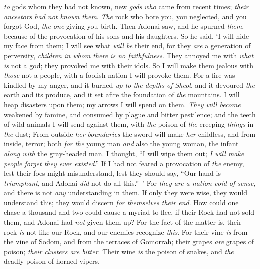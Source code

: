 \begin{biblechapter}
\textit{to} gods whom they had not known, 
new \textit{gods} \textit{who} came from recent times; 
\textit{their ancestors had not known them}.
\verse \textit{The} rock who bore you, you neglected, 
and you forgot God, \textit{the one} giving you birth.
\verse Then Adonai saw, and he spurned \textit{them}, 
because of the provocation of his sons and his daughters.
\verse So he said, ‘I will hide my face from them; 
I will see what \textit{will be} their end, 
for they \textit{are} a generation of perversity, 
\textit{children in whom there is no faithfulness}.
\verse They annoyed me with \textit{what is} not a god; 
they provoked me with their idols. 
So I will make them jealous with \textit{those} not a people, 
with a foolish nation I will provoke them.
\verse For a fire was kindled by my anger, 
and it burned \textit{up to the depths of Sheol}, 
and it devoured \textit{the} earth and its produce, 
and it set afire the foundation of \textit{the} mountains.
\verse I will heap disasters upon them; 
my arrows I will spend on them.
\verse \textit{They will become} weakened by famine, 
and consumed by plague and bitter pestilence; 
and the teeth of wild animals I will send against them, 
with \textit{the} poison of \textit{the} creeping \textit{things} in \textit{the} dust;
\verse From outside \textit{her boundaries} the sword will make \textit{her} childless, 
and from inside, terror; 
both \textit{for} \textit{the} young man \textit{and} also the young woman, 
the infant \textit{along with} the gray-headed man.
\verse I thought, “I will wipe them out; 
\textit{I will make people forget they ever existed}.”
\verse If I had not feared a provocation of \textit{the} enemy, 
lest their foes might misunderstand,  
lest they should say,  “Our hand is 
\textit{triumphant}, and Adonai \textit{did} not do all this.” ’
\verse For \textit{they are a nation void of sense}, 
and there is not \textit{any} understanding in them.
\verse If only they were wise, they would understand this; 
they would discern \textit{for themselves their end}.
\verse How could one chase a thousand 
and two could cause a myriad to flee, 
if their Rock had not sold them, 
and Adonai had \textit{not} given them up?
\verse For the fact of the matter is, 
their rock \textit{is} not like our Rock, 
and our enemies recognize \textit{this}.
\verse For their vine \textit{is} from the vine of Sodom, 
and from the terraces of Gomorrah; 
their grapes \textit{are} grapes of poison; 
\textit{their clusters are bitter}.
\verse Their wine \textit{is} the poison of snakes, 
and \textit{the} deadly poison of horned vipers.

\end{biblechapter}
